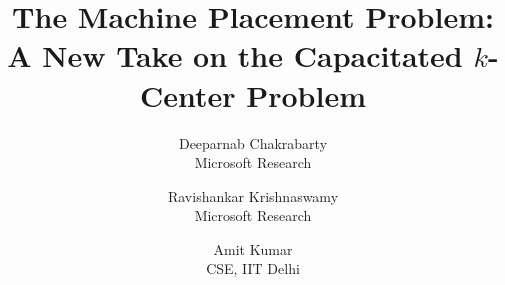 \documentclass{article}[11pt]
\begin{document}
\title{The Machine Placement Problem: \\  A New Take on the Capacitated $k$-Center Problem}
\date{}
\author{Deeparnab Chakrabarty \\ Microsoft Research \and Ravishankar Krishnaswamy \\ Microsoft Research \and Amit Kumar \\ CSE, IIT Delhi}
\maketitle

%
%
%
\end{document}
